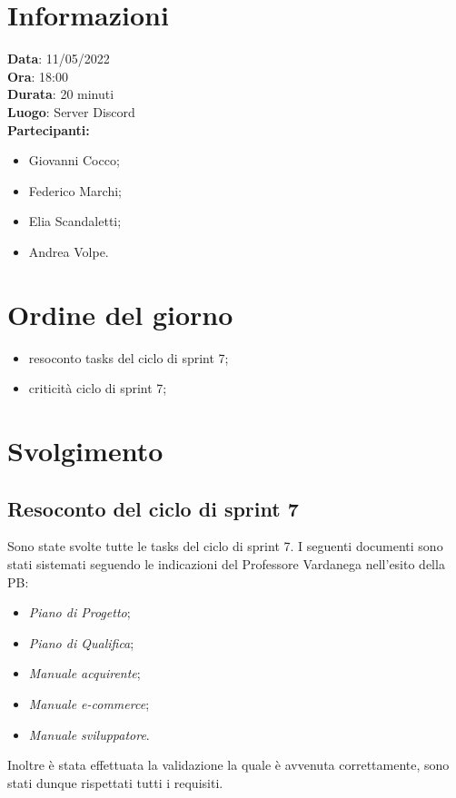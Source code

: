 \documentclass[a4paper, 12pt]{article}
\begin{document}
\makefrontpage

\section{Informazioni}
\textbf{Data}: 11/05/2022\\
\textbf{Ora}: 18:00\\
\textbf{Durata}: 20 minuti\\
\textbf{Luogo}: Server Discord\\

\textbf{Partecipanti:}
\begin{itemize}
  \item Giovanni Cocco;
  \item Federico Marchi;
	\item Elia Scandaletti;
	\item Andrea Volpe.
\end{itemize}


\section{Ordine del giorno}
\begin{itemize}
	\item resoconto tasks del ciclo di sprint 7;
  \item criticità ciclo di sprint 7;
\end{itemize}

\section{Svolgimento}

\subsection{Resoconto del ciclo di sprint 7}
Sono state svolte tutte le tasks del ciclo di sprint 7. I seguenti documenti sono stati sistemati seguendo le indicazioni del Professore Vardanega nell'esito della PB:
\begin{itemize}
  \item \textit{Piano di Progetto};
  \item \textit{Piano di Qualifica};
  \item \textit{Manuale acquirente};
  \item \textit{Manuale e-commerce};
  \item \textit{Manuale sviluppatore}.
\end{itemize}
Inoltre è stata effettuata la validazione la quale è avvenuta correttamente, sono stati dunque rispettati tutti i requisiti.
\end{document}
